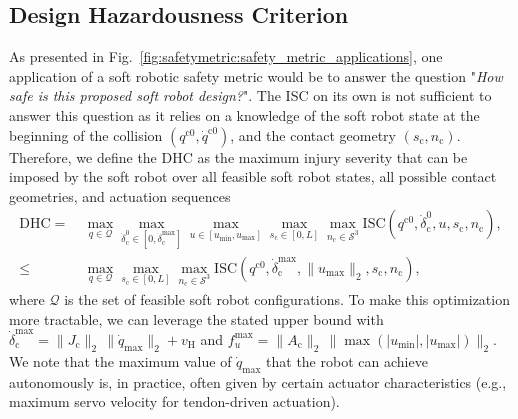 \subsection{Design Hazardousness Criterion}
As presented in Fig.~\ref{fig:safetymetric:safety_metric_applications}, one application of a soft robotic safety metric would be to answer the question "\emph{How safe is this proposed soft robot design?}". The \gls{ISC} on its own is not sufficient to answer this question as it relies on a knowledge of the soft robot state at the beginning of the collision $(q^{\mathrm{c}0}, \dot{q}^{\mathrm{c}0})$, and the contact geometry $(s_\mathrm{c},n_\mathrm{c})$.
Therefore, we define the \gls{DHC} as the maximum injury severity that can be imposed by the soft robot over all feasible soft robot states, all possible contact geometries, and actuation sequences
\begin{equation}
\begin{split}
    \mathrm{DHC} =& \: \max_{q \in \mathcal{Q}} \max_{\dot{\delta}_\mathrm{c}^0 \in [0,\dot{\delta}_\mathrm{c}^\mathrm{max}]} \max_{u \in [u_\mathrm{min}, u_\mathrm{max}]} \max_{s_\mathrm{c} \in [0,L]} \max_{n_\mathrm{c} \in \mathcal{S}^3} \mathrm{ISC}(q^{\mathrm{c}0},\dot{\delta}_\mathrm{c}^0,u,s_\mathrm{c},n_\mathrm{c}),\\
    \leq& \: \max_{q \in \mathcal{Q}} \max_{s_\mathrm{c} \in [0,L]} \max_{n_\mathrm{c} \in \mathcal{S}^3} \mathrm{ISC}(q^{\mathrm{c}0},\dot{\delta}_\mathrm{c}^\mathrm{max},\lVert u_\mathrm{max} \rVert_2,s_\mathrm{c},n_\mathrm{c}),
\end{split}
\end{equation}
where $\mathcal{Q}$ is the set of feasible soft robot configurations.
To make this optimization more tractable, we can leverage the stated upper bound with $\dot{\delta}_\mathrm{c}^\mathrm{max} = \lVert J_\mathrm{c} \rVert_2 \, \lVert \dot{q}_\mathrm{max} \rVert_2 + v_\mathrm{H}$
and $f_u^\mathrm{max} = \lVert A_\mathrm{c} \rVert_2 \, \lVert \max(|u_\mathrm{min}|,|u_\mathrm{max}|) \rVert_2$.
We note that the maximum value of $\dot{q}_\mathrm{max}$ that the robot can achieve autonomously is, in practice, often given by certain actuator characteristics (e.g., maximum servo velocity for tendon-driven actuation).